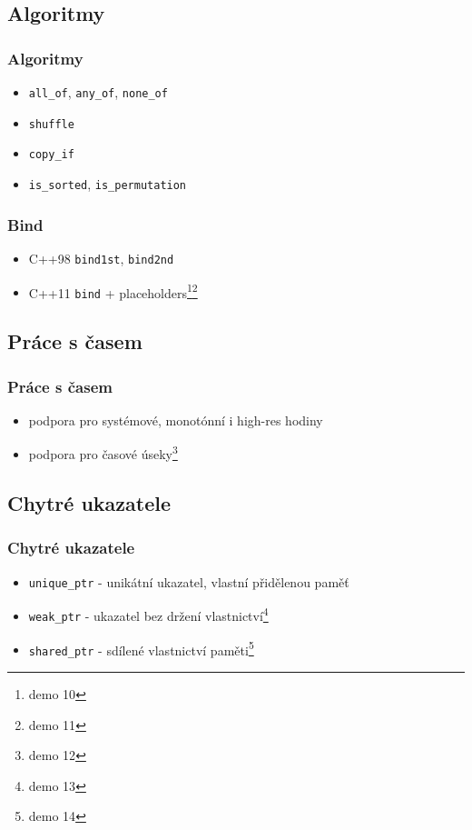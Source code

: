\subsection{Algoritmy}

\begin{frame} \frametitle{Algoritmy}
	\begin{itemize}
		\item \texttt{all\_of}, \texttt{any\_of}, \texttt{none\_of}
		\item \texttt{shuffle}
		\item \texttt{copy\_if}
		\item \texttt{is\_sorted}, \texttt{is\_permutation}
	\end{itemize}
\end{frame}

\begin{frame} \frametitle{Bind}
	\begin{itemize}
		\item C++98 \texttt{bind1st}, \texttt{bind2nd}
		\item C++11 \texttt{bind} + placeholders\footnote{demo 10}\footnote{demo 11}
	\end{itemize}
\end{frame}

\subsection{Práce s časem}

\begin{frame} \frametitle{Práce s časem}
	\begin{itemize}
		\item podpora pro systémové, monotónní i high-res hodiny
		\item podpora pro časové úseky\footnote{demo 12}
	\end{itemize}
\end{frame}

\subsection{Chytré ukazatele}

\begin{frame} \frametitle{Chytré ukazatele}
	\begin{itemize}
		\item \texttt{unique\_ptr} - unikátní ukazatel, vlastní přidělenou paměť
		\item \texttt{weak\_ptr} - ukazatel bez držení vlastnictví\footnote{demo 13}
		\item \texttt{shared\_ptr} - sdílené vlastnictví paměti\footnote{demo 14}
	\end{itemize}
\end{frame}

